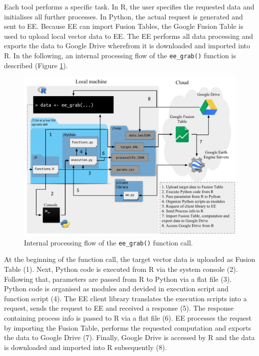 Each tool performs a specific task. In R, the user specifies the requested data and initialises all further processes. In Python, the actual request is generated and sent to EE. Because EE can import Fusion Tables, the Google Fusion Table is used to upload local vector data to EE. The EE performs all data processing and exports the data to Google Drive wherefrom it is downloaded and imported into R. 
In the following, an internal processing flow of the \texttt{ee\_grab()} function is described (Figure \ref{processingFlow}).
\begin{center}
	\begin{figure}[h]
		\begin{center}
			\includegraphics[width=15cm]{images/processing_flow_big.pdf}
			\caption{Internal processing flow of the \texttt{ee\_grab()} function call.}
			\label{processingFlow}
		\end{center}
	\end{figure}
\end{center}


At the beginning of the function call, the target vector data is uploaded as Fusion Table (1). Next, Python code is executed from R via the system console (2). 
Following that, parameters are passed from R to Python via a flat file (3). Python code is organised as modules and devided in execution script and function script (4). The EE client library translates the execution scripts into a request, sends the request to EE  and received a response (5). The response containing process info is passed to R via a flat file (6). EE processes the request by importing the Fusion Table, performs the requested computation and exports the data to Google Drive (7).
Finally, Google Drive is accessed by R and the data is downloaded and imported into R subsequently (8).


